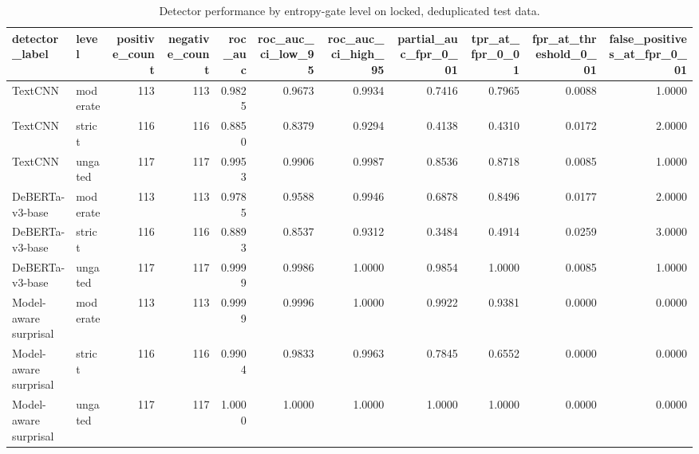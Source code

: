 \begin{table}
\caption{Detector performance by entropy-gate level on locked, deduplicated test data.}
\label{tab:entropy-gate-detectors}
\begin{tabular}{llrrrrrrrrr}
\toprule
detector\_label & level & positive\_count & negative\_count & roc\_auc & roc\_auc\_ci\_low\_95 & roc\_auc\_ci\_high\_95 & partial\_auc\_fpr\_0\_01 & tpr\_at\_fpr\_0\_01 & fpr\_at\_threshold\_0\_01 & false\_positives\_at\_fpr\_0\_01 \\
\midrule
TextCNN & moderate & 113 & 113 & 0.9825 & 0.9673 & 0.9934 & 0.7416 & 0.7965 & 0.0088 & 1.0000 \\
TextCNN & strict & 116 & 116 & 0.8850 & 0.8379 & 0.9294 & 0.4138 & 0.4310 & 0.0172 & 2.0000 \\
TextCNN & ungated & 117 & 117 & 0.9953 & 0.9906 & 0.9987 & 0.8536 & 0.8718 & 0.0085 & 1.0000 \\
DeBERTa-v3-base & moderate & 113 & 113 & 0.9785 & 0.9588 & 0.9946 & 0.6878 & 0.8496 & 0.0177 & 2.0000 \\
DeBERTa-v3-base & strict & 116 & 116 & 0.8893 & 0.8537 & 0.9312 & 0.3484 & 0.4914 & 0.0259 & 3.0000 \\
DeBERTa-v3-base & ungated & 117 & 117 & 0.9999 & 0.9986 & 1.0000 & 0.9854 & 1.0000 & 0.0085 & 1.0000 \\
Model-aware surprisal & moderate & 113 & 113 & 0.9999 & 0.9996 & 1.0000 & 0.9922 & 0.9381 & 0.0000 & 0.0000 \\
Model-aware surprisal & strict & 116 & 116 & 0.9904 & 0.9833 & 0.9963 & 0.7845 & 0.6552 & 0.0000 & 0.0000 \\
Model-aware surprisal & ungated & 117 & 117 & 1.0000 & 1.0000 & 1.0000 & 1.0000 & 1.0000 & 0.0000 & 0.0000 \\
\bottomrule
\end{tabular}
\end{table}
